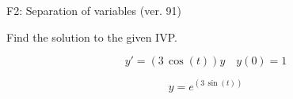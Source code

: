 \begin{exercise}
  \begin{exerciseTitle}F2: Separation of variables (ver. 91)\end{exerciseTitle}
  \begin{exerciseStatement}
    
Find the solution to the given IVP.

    
\[y'=( 3 \, \cos\left(t\right) )y\hspace{1em} y(0)= 1\]

  \end{exerciseStatement}
  \begin{exerciseAnswer}
    
\[y= e^{\left(3 \, \sin\left(t\right)\right)}\]

  \end{exerciseAnswer}
\end{exercise}